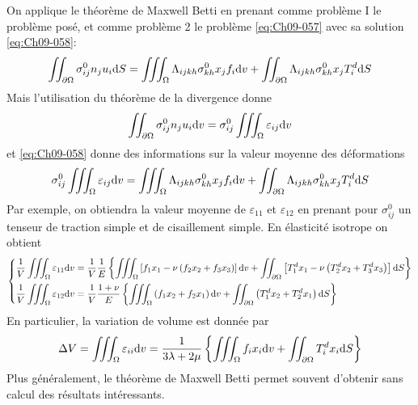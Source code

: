 On applique le théorème de Maxwell Betti en prenant comme problème I  le problème posé, et comme problème 2 le problème \eqref{eq:Ch09-057} avec sa solution \eqref{eq:Ch09-058}:
\[
\iint_{\partial \Omega} \sigma_{ij}^0 n_j u_i \mathrm{d} S = \iiint_{\Omega} \Lambda_{ijkh} \sigma_{kh}^0 x_j f_i \mathrm{d} v + \iint_{\partial \Omega} \Lambda_{ijkh} \sigma_{kh}^0 x_j T_i^d \mathrm{d} S
\]
Mais l'utilisation du théorème de la divergence donne 
\[
\iint_{\partial \Omega} \sigma_{ij}^0 n_j u_i \mathrm{d} v = \sigma_{ij}^0 \iiint_{\Omega} \varepsilon_{ij} \mathrm{d} v
\]
et \eqref{eq:Ch09-058} donne des informations sur la valeur moyenne des déformations 
\begin{equation}
    \sigma_{ij}^0 \iiint_{\Omega} \varepsilon_{ij} \mathrm{d} v = \iiint_{\Omega} \Lambda_{ijkh} \sigma_{kh}^0 x_j f_i \mathrm{d} v + \iint_{\partial \Omega} \Lambda_{ijkh} \sigma_{kh}^0 x_j T_i^d \mathrm{d} S
    \label{eq:Ch09-059}
\end{equation}
Par exemple, on obtiendra la valeur moyenne de $\varepsilon_{11}$ et $\varepsilon_{12}$ en prenant pour $\sigma_{ij}^0$ un tenseur de traction simple et de cisaillement simple.
En élasticité isotrope on obtient
\begin{equation}
    \left\{
    \begin{aligned}
        \frac{1}{V} \iiint_{\Omega} \varepsilon_{11} \mathrm{d} v &= \frac{1}{V} \frac{1}{E} \left\{ \iiint_{\Omega} \left[ f_1 x_1 - \nu \left( f_2 x_2 + f_3 x_3 \right) \right] \mathrm{d} v + \iint_{\partial \Omega} \left[ T_1^d x_1 - \nu \left( T_2^d x_2 + T_3^d x_3 \right) \right] \mathrm{d} S \right\} \\
        \frac{1}{V} \iiint_{\Omega} \varepsilon_{12} \mathrm{d} v &= \frac{1}{V} \frac{1+ \nu}{E} \left\{ \iiint_{\Omega} \left( f_1 x_2 + f_2 x_1 \right) \mathrm{d} v + \iint_{\partial \Omega} \left( T_1^d x_2 + T_2^d x_1 \right) \mathrm{d} S \right\}
    \end{aligned}
    \right.
    \label{eq:Ch09-060}
\end{equation}
En particulier, la variation de volume est donnée par 
\begin{equation}
    \Delta V = \iiint_{\Omega} \varepsilon_{ii} \mathrm{d} v = \frac{1}{3\lambda+2\mu} \left\{ \iiint_{\Omega} f_i x_i \mathrm{d} v + \iint_{\partial \Omega} T_i^d x_i \mathrm{d} S \right\}
    \label{eq:Ch09-061}
\end{equation}
Plus généralement, le théorème de Maxwell Betti permet souvent d'obtenir sans calcul des résultats intéressants. 

